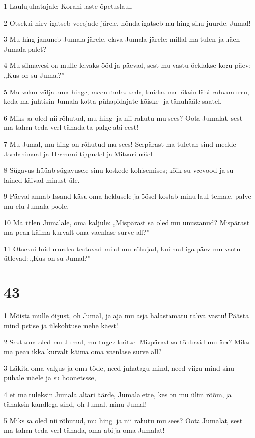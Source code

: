 \par 1 Laulujuhatajale: Korahi laste õpetuslaul.
\par 2 Otsekui hirv igatseb veeojade järele, nõnda igatseb mu hing sinu juurde, Jumal!
\par 3 Mu hing januneb Jumala järele, elava Jumala järele; millal ma tulen ja näen Jumala palet?
\par 4 Mu silmavesi on mulle leivaks ööd ja päevad, sest mu vastu öeldakse kogu päev: „Kus on su Jumal?”
\par 5 Ma valan välja oma hinge, meenutades seda, kuidas ma läksin läbi rahvamurru, keda ma juhtisin Jumala kotta pühapidajate hõiske- ja tänuhääle saatel.
\par 6 Miks sa oled nii rõhutud, mu hing, ja nii rahutu mu sees? Oota Jumalat, sest ma tahan teda veel tänada ta palge abi eest!
\par 7 Mu Jumal, mu hing on rõhutud mu sees! Seepärast ma tuletan sind meelde Jordanimaal ja Hermoni tippudel ja Mitsari mäel.
\par 8 Sügavus hüüab sügavusele sinu koskede kohisemises; kõik su veevood ja su lained käivad minust üle.
\par 9 Päeval annab Issand käsu oma heldusele ja öösel kostab minu laul temale, palve mu elu Jumala poole.
\par 10 Ma ütlen Jumalale, oma kaljule: „Mispärast sa oled mu unustanud? Mispärast ma pean käima kurvalt oma vaenlase surve all?”
\par 11 Otsekui luid murdes teotavad mind mu rõhujad, kui nad iga päev mu vastu ütlevad: „Kus on su Jumal?”

\chapter{43}

\par 1 Mõista mulle õigust, oh Jumal, ja aja mu asja halastamatu rahva vastu! Päästa mind petise ja ülekohtuse mehe käest!
\par 2 Sest sina oled mu Jumal, mu tugev kaitse. Mispärast sa tõukasid mu ära? Miks ma pean ikka kurvalt käima oma vaenlase surve all?
\par 3 Läkita oma valgus ja oma tõde, need juhatagu mind, need viigu mind sinu pühale mäele ja su hoonetesse,
\par 4 et ma tuleksin Jumala altari äärde, Jumala ette, kes on mu ülim rõõm, ja tänaksin kandlega sind, oh Jumal, minu Jumal!
\par 5 Miks sa oled nii rõhutud, mu hing, ja nii rahutu mu sees? Oota Jumalat, sest ma tahan teda veel tänada, oma abi ja oma Jumalat!

